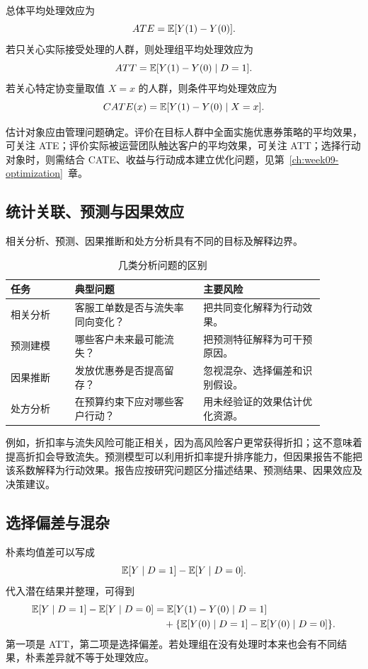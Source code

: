 \begin{definition}[平均处理效应]
总体平均处理效应为
\[
  ATE=\mathbb E[Y(1)-Y(0)].
\]
若只关心实际接受处理的人群，则处理组平均处理效应为
\[
  ATT=\mathbb E[Y(1)-Y(0)\mid D=1].
\]
若关心特定协变量取值 \(X=x\) 的人群，则条件平均处理效应为
\[
  CATE(x)=\mathbb E[Y(1)-Y(0)\mid X=x].
\]
\end{definition}

估计对象应由管理问题确定。评价在目标人群中全面实施优惠券策略的平均效果，可关注 ATE；评价实际被运营团队触达客户的平均效果，可关注 ATT；选择行动对象时，则需结合 CATE、收益与行动成本建立优化问题，见第~\ref{ch:week09-optimization}~章。

\subsection{统计关联、预测与因果效应}

相关分析、预测、因果推断和处方分析具有不同的目标及解释边界。

\begin{table}[htbp]
\centering
\caption{几类分析问题的区别}
\begin{tabular}{P{0.18\linewidth}P{0.36\linewidth}P{0.34\linewidth}}
\toprule
{}
任务 & 典型问题 & 主要风险\\
\midrule

相关分析 & 客服工单数是否与流失率同向变化？ & 把共同变化解释为行动效果。\\
预测建模 & 哪些客户未来最可能流失？ & 把预测特征解释为可干预原因。\\
因果推断 & 发放优惠券是否提高留存？ & 忽视混杂、选择偏差和识别假设。\\
处方分析 & 在预算约束下应对哪些客户行动？ & 用未经验证的效果估计优化资源。\\
\bottomrule
\end{tabular}
\end{table}

例如，折扣率与流失风险可能正相关，因为高风险客户更常获得折扣；这不意味着提高折扣会导致流失。预测模型可以利用折扣率提升排序能力，但因果报告不能把该系数解释为行动效果。报告应按研究问题区分描述结果、预测结果、因果效应及决策建议。

\subsection{选择偏差与混杂}

朴素均值差可以写成
\[
  \mathbb E[Y\mid D=1]-\mathbb E[Y\mid D=0].
\]
代入潜在结果并整理，可得到
\[
\begin{aligned}
  \mathbb E[Y\mid D=1]-\mathbb E[Y\mid D=0]
  &=
  \mathbb E[Y(1)-Y(0)\mid D=1] \\
  &\quad +
  \{\mathbb E[Y(0)\mid D=1]-\mathbb E[Y(0)\mid D=0]\}.
\end{aligned}
\]
第一项是 ATT，第二项是选择偏差。若处理组在没有处理时本来也会有不同结果，朴素差异就不等于处理效应。

